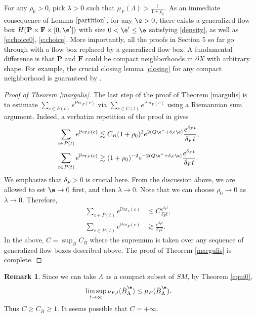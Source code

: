 \documentclass[11pt]{amsart}
\theoremstyle{definition}
\newtheorem{remark}[theorem]{Remark}
\def\pX{{\partial X}}
\def\lB{{\underline B}}
\def\a{\alpha}
\def\d{\delta}   %
\def\l{\lambda}   \def\L{\Lambda}
\def\bP{\textbf{P}}
\def\bF{\textbf{F}}
\newcommand{\Per}{\mathrm{Per}}
\begin{document}
For any $\rho_0>0$, pick $\l>0$ such that $\mu_F(\L)>\frac{1}{1+\rho_0}$. As an immediate consequence of Lemma $\ref{partition}$, for any $\e>0$, there exists a generalized flow box $H(\bP\times \bF\times [0,\e'])$ with size $0<\e'\le \e$ satisfying \eqref{density}, as well as \eqref{e:choice0}, \eqref{e:choice}. More importantly, all the proofs in Section 5 so far go through with a flow box replaced by a generalized flow box. A fundamental difference is that $\bP$ and $\bF$ could be compact neighborhoods in $\pX$ with arbitrary shape. For example, the crucial closing lemma \ref{closing} for any compact neighborhood is guaranteed by \cite[Corollary 3.5]{Ri}.


\begin{proof}[Proof of Theorem \ref{margulis}]
The last step of the proof of Theorem \ref{margulis} is to estimate $\sum_{c\in P(t)}e^{\Per_F(c)}$ via $\sum_{c\in C(t)}e^{\Per_F(c)}$ using a Riemannian sum argument.
Indeed, a verbatim repetition of the proof in \cite[Section 6.2]{CKW2} gives
\begin{equation*}
\begin{aligned}
\sum_{c\in P(t)}e^{\Per_F(c)}&\lesssim C_B(1+\rho_0)^{2}e^{2(Q\e^\a+\d_F\e)}\frac{e^{\d_Ft}}{\d_Ft},\\
\sum_{c\in P(t)}e^{\Per_F(c)}&\gtrsim (1+\rho_0)^{-2}e^{-2(Q\e^\a+\d_F\e)}\frac{e^{\d_Ft}}{\d_Ft}.
\end{aligned}
\end{equation*}
We emphasize that $\d_F>0$ is crucial here. From the discussion above, we are allowed to set $\e\to 0$ first, and then $\l\to 0$. Note that we can choose $\rho_0\to 0$ as $\l\to 0$. Therefore,
\begin{equation*}
\begin{aligned}
\sum_{c\in P(t)}e^{\Per_F(c)}&\lesssim C\frac{e^{\d_Ft}}{\d_Ft},\\
\sum_{c\in P(t)}e^{\Per_F(c)}&\gtrsim \frac{e^{\d_Ft}}{\d_Ft}.
\end{aligned}
\end{equation*}
In the above, $C=\sup_BC_B$ where the supremum is taken over any sequence of generalized flow boxes described above.
The proof of Theorem \ref{margulis} is complete.
\end{proof}
\begin{remark}\label{CB1}
Since we can take $\L$ as a compact subset of $SM$, by Theorem \ref{equi0}, 
$$\limsup_{t\to \infty}\nu_{F,t}(\tilde \lB_\L^\e)\le \mu_F(\tilde \lB_\L^\e).$$
Thus $C\ge C_B\ge 1$. It seems possible that $C=+\infty$.
\end{remark}
\end{document}

